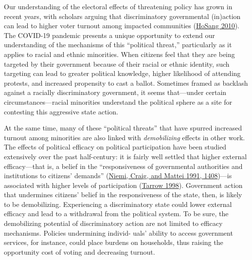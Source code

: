 \documentclass[
  12pt,
]{article}
\begin{document}
Our understanding of the electoral effects of threatening policy has grown in recent years, with scholars arguing that discriminatory governmental (in)action can lead to higher voter turnout among impacted communities (\protect\hyperlink{ref-HoSang2010}{HoSang 2010}). The COVID-19 pandemic presents a unique opportunity to extend our understanding of the mechanisms of this ``political threat,'' particularly as it applies to racial and ethnic minorities. When citizens feel that they are being targeted by their government because of their racial or ethnic identity, such targeting can lead to greater political knowledge, higher likelihood of attending protests, and increased propensity to cast a ballot. Sometimes framed as backlash against a racially discriminatory government, it seems that---under certain circumstances---racial minorities understand the political sphere as a site for contesting this aggressive state action.

At the same time, many of these ``political threats'' that have spurred increased turnout among minorities are also linked with \emph{demobilizing} effects in other work. The effects of political efficacy on political participation have been studied extensively over the past half-century: it is fairly well settled that higher external efficacy---that is, a belief in the ``responsiveness of governmental authorities and institutions to citizens' demands'' (\protect\hyperlink{ref-Niemi1991}{Niemi, Craig, and Mattei 1991, 1408})---is associated with higher levels of participation (\protect\hyperlink{ref-Tarrow1998}{Tarrow 1998}). Government action that undermines citizens' belief in the responsiveness of the state, then, is likely to be demobilizing. Experiencing a discriminatory state could lower external efficacy and lead to a withdrawal from the political system. To be sure, the demobilizing potential of discriminatory action are not limited to efficacy mechanisms. Policies undermining individ- uals' ability to access government services, for instance, could place burdens on households, thus raising the opportunity cost of voting and decreasing turnout.
\end{document}
